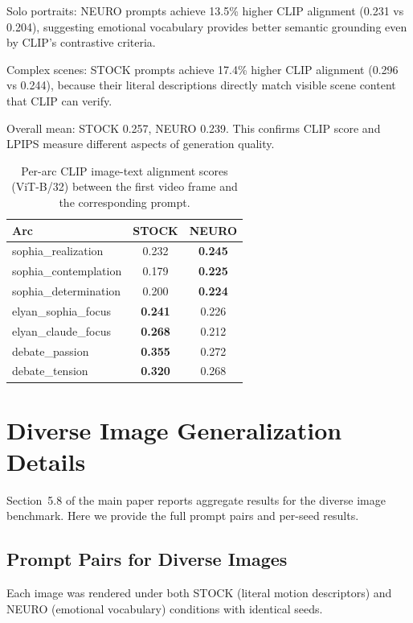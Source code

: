 \documentclass[10pt,twocolumn,letterpaper]{article}
\begin{document}
Solo portraits: NEURO prompts achieve 13.5\% higher CLIP alignment (0.231 vs 0.204), suggesting emotional vocabulary provides better semantic grounding even by CLIP's contrastive criteria.

Complex scenes: STOCK prompts achieve 17.4\% higher CLIP alignment (0.296 vs 0.244), because their literal descriptions directly match visible scene content that CLIP can verify.

Overall mean: STOCK 0.257, NEURO 0.239. This confirms CLIP score and LPIPS measure different aspects of generation quality.

\begin{table}[h]
\centering
\small
\caption{Per-arc CLIP image-text alignment scores (ViT-B/32) between the first video frame and the corresponding prompt.}
\label{tab:clip_alignment}
\begin{tabular}{lcc}
\toprule
\textbf{Arc} & \textbf{STOCK} & \textbf{NEURO} \\
\midrule
sophia\_realization & 0.232 & \textbf{0.245} \\
sophia\_contemplation & 0.179 & \textbf{0.225} \\
sophia\_determination & 0.200 & \textbf{0.224} \\
elyan\_sophia\_focus & \textbf{0.241} & 0.226 \\
elyan\_claude\_focus & \textbf{0.268} & 0.212 \\
debate\_passion & \textbf{0.355} & 0.272 \\
debate\_tension & \textbf{0.320} & 0.268 \\
\bottomrule
\end{tabular}
\end{table}

\section{Diverse Image Generalization Details}
\label{app:diverse}

Section~5.8 of the main paper reports aggregate results for the diverse image benchmark. Here we provide the full prompt pairs and per-seed results.

\subsection{Prompt Pairs for Diverse Images}

Each image was rendered under both STOCK (literal motion descriptors) and NEURO (emotional vocabulary) conditions with identical seeds.
\end{document}

